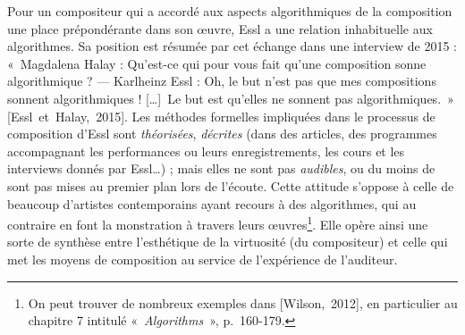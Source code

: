 \documentclass[a4paper,12pt]{article}
\newcommand{\guill}[1]{«~#1~»}
\newcommand{\zitat}[2]{\#Citation(#2)\#}
\newcommand{\tpp}[0]{[\dots]}
\newcommand{\cicite}[1]{{\footnotesize[#1]}}
\begin{document}
Pour un compositeur qui a accordé aux aspects algorithmiques de la composition une place prépondérante dans son œuvre, Essl a une relation inhabituelle aux algorithmes. Sa position est résumée par cet échange dans une interview de 2015 : \guill{Magdalena Halay : Qu'est-ce qui pour vous fait qu'une composition sonne algorithmique ? --- Karlheinz Essl : Oh, le but n'est pas que mes compositions sonnent algorithmiques ! \tpp~Le but est qu'elles ne sonnent pas algorithmiques.} \cicite{Essl~et~Halay,~2015}.
Les méthodes formelles impliquées dans le processus de composition d'Essl sont \emph{théorisées}, \emph{décrites} (dans des articles, des programmes accompagnant les performances ou leurs enregistrements, les cours et les interviews donnés par Essl\dots) ; mais elles ne sont pas \emph{audibles}, ou du moins de sont pas mises au premier plan lors de l'écoute. Cette attitude s'oppose à celle de beaucoup d'artistes contemporains ayant recours à des algorithmes, qui au contraire en font la monstration à travers leurs œuvres\footnote{On peut trouver de nombreux exemples dans \cicite{Wilson,~2012}, en particulier au chapitre 7 intitulé \guill{\emph{Algorithms}}, p.~160-179.}. Elle opère ainsi une sorte de synthèse entre l'esthétique de la virtuosité (du compositeur) et celle qui met les moyens de composition au service de l'expérience de l'auditeur.


\end{document}
